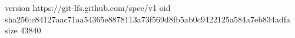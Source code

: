 version https://git-lfs.github.com/spec/v1
oid sha256:c84127aac71aa54365e8878113a73f569d8fb5ab0c9422125a584a7eb834adfa
size 43840
